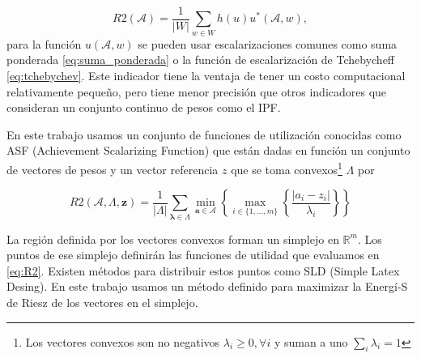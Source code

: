 \begin{equation} 
    R2(\mathcal{A})=\frac{1}{|W|}\sum_{w\in W} h(u)u^*(\mathcal{A},w), \nonumber
\end{equation}
para la función $u(\mathcal{A},w)$ se pueden usar escalarizaciones comunes como suma ponderada \eqref{eq:suma_ponderada} o la función de escalarización de Tchebycheff \eqref{eq:tchebychev}. Este indicador tiene la ventaja de tener un costo computacional relativamente pequeño, pero tiene menor precisión que otros indicadores que consideran un conjunto continuo de pesos como el IPF. 



En este trabajo usamos un conjunto de funciones de utilización conocidas como ASF (Achievement Scalarizing Function) que están dadas en función un conjunto de vectores de pesos y un vector referencia $z$ que se toma convexos\footnote{Los vectores convexos son no negativos $\lambda_i\geq 0, \forall i$ y suman a uno $\sum_i \lambda_i =1$} $\Lambda$ por

\begin{equation}\label{eq:R2}
    R2(\mathcal{A}, \Lambda, \mathbf{z}) = \frac{1}{|\Lambda|} \sum_{\mathbf{\lambda} \in \Lambda} \min_{\mathbf{a} \in \mathcal{A}} \left\{ \max_{i \in \{1, \ldots, m\}} \left\{ \frac{|a_i - z_i|}{\lambda_i} \right\} \right\}
\end{equation}

La región definida por los vectores convexos forman un simplejo en $\mathbb{R}^m$. Los puntos de ese simplejo definirán las funciones de utilidad que evaluamos en \ref{eq:R2}. Existen métodos para distribuir estos puntos como SLD (Simple Latex Desing). En este trabajo usamos un método definido para maximizar la Energí-S de Riesz de los vectores en el simplejo. 


